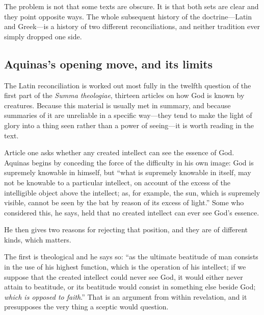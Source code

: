 The problem is not that some texts are obscure. It is that both sets are clear and they point opposite ways. The whole subsequent history of the doctrine---Latin and Greek---is a history of two different reconciliations, and neither tradition ever simply dropped one side.

\subsection{Aquinas's opening move, and its limits}

The Latin reconciliation is worked out most fully in the twelfth question of the first part of the \emph{Summa theologiae}, thirteen articles on how God is known by creatures. Because this material is usually met in summary, and because summaries of it are unreliable in a specific way---they tend to make the light of glory into a thing seen rather than a power of seeing---it is worth reading in the text.

Article one asks whether any created intellect can see the essence of God. Aquinas begins by conceding the force of the difficulty in his own image: God is supremely knowable in himself, but ``what is supremely knowable in itself, may not be knowable to a particular intellect, on account of the excess of the intelligible object above the intellect; as, for example, the sun, which is supremely visible, cannot be seen by the bat by reason of its excess of light.'' Some who considered this, he says, held that no created intellect can ever see God's essence.

He then gives two reasons for rejecting that position, and they are of different kinds, which matters.

The first is theological and he says so: ``as the ultimate beatitude of man consists in the use of his highest function, which is the operation of his intellect; if we suppose that the created intellect could never see God, it would either never attain to beatitude, or its beatitude would consist in something else beside God; \emph{which is opposed to faith}.'' That is an argument from within revelation, and it presupposes the very thing a sceptic would question.

